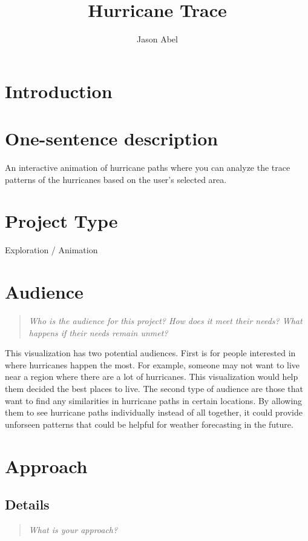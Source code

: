 \documentclass{proc}
\begin{document}
\title{Hurricane Trace}

\author{Jason Abel}

\maketitle

\section{Introduction}

\section{One-sentence description}

An interactive animation of hurricane paths where you can analyze the trace patterns of the hurricanes based on the user's selected area. 

\section{Project Type}

Exploration / Animation

\section{Audience} 
\begin{quote}
\textit{Who is the audience for this project? 
How does it meet their needs? 
What happens if their needs remain unmet?}
\end{quote}

This visualization has two potential audiences. First is for people interested in where hurricanes happen the most. For example, someone may not want to live near a region where there are a lot of hurricanes. This visualization would help them decided the best places to live. The second type of audience are those that want to find any similarities in hurricane paths in certain locations. By allowing them to see hurricane paths individually instead of all together, it could provide unforseen patterns that could be helpful for weather forecasting in the future.

\section{Approach}
\subsection{Details}
\begin{quote}
\textit{What is your approach?}
\end{quote}
\end{document}
